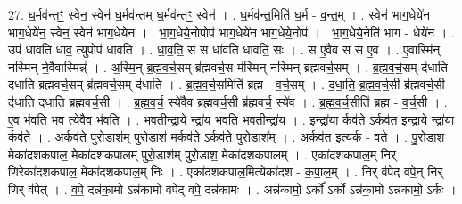 \documentclass[17pt]{extarticle}
\begin{document}
27. घ॒र्मव॑न्तꣳ॒॒ स्वेन॒ स्वेन॑ घ॒र्मव॑न्तम् घ॒र्मव॑न्तꣳ॒॒ स्वेन॑ । . घ॒र्मव॑न्त॒मिति॑ घ॒र्म - व॒न्त॒म् । . स्वेन॑ भाग॒धेये॑न भाग॒धेये॑न॒ स्वेन॒ स्वेन॑ भाग॒धेये॑न । . भा॒ग॒धेये॒नोपोप॑ भाग॒धेये॑न भाग॒धेये॒नोप॑ । . भा॒ग॒धेये॒नेति॑ भाग - धेये॑न । . उप॑ धावति धाव॒ त्युपोप॑ धावति । . धा॒व॒ति॒ स स धा॑वति धावति॒ सः । . स ए॒वैव स स ए॒व । . ए॒वास्मि॑न् नस्मिन् ने॒वैवास्मिन्न्॑ । . अ॒स्मि॒न् ब्र॒ह्म॒व॒र्च॒सम् ब्र॑ह्मवर्च॒स म॑स्मिन् नस्मिन् ब्रह्मवर्च॒सम् । . ब्र॒ह्म॒व॒र्च॒सम् द॑धाति दधाति ब्रह्मवर्च॒सम् ब्र॑ह्मवर्च॒सम् द॑धाति । . ब्र॒ह्म॒व॒र्च॒समिति॑ ब्रह्म - व॒र्च॒सम् । . द॒धा॒ति॒ ब्र॒ह्म॒व॒र्च॒सी ब्र॑ह्मवर्च॒सी द॑धाति दधाति ब्रह्मवर्च॒सी । . ब्र॒ह्म॒व॒र्च॒ स्ये॑वैव ब्र॑ह्मवर्च॒सी ब्र॑ह्मवर्च॒ स्ये॑व । . ब्र॒ह्म॒व॒र्च॒सीति॑ ब्रह्म - व॒र्च॒सी । . ए॒व भ॑वति भव त्ये॒वैव भ॑वति । . भ॒व॒तीन्द्रा॒ये न्द्रा॑य भवति भव॒तीन्द्रा॑य । . इन्द्रा॑या॒ र्कव॑ते॒ ऽर्कव॑त॒ इन्द्रा॒ये न्द्रा॑या॒ र्कव॑ते । . अ॒र्कव॑ते पुरो॒डाश॑म् पुरो॒डाश॑ म॒र्कव॑ते॒ ऽर्कव॑ते पुरो॒डाश᳚म् । . अ॒र्कव॑त॒ इत्य॒र्क - व॒ते॒ । . पु॒रो॒डाश॒ मेका॑दशकपाल॒ मेका॑दशकपालम् पुरो॒डाश॑म् पुरो॒डाश॒ मेका॑दशकपालम् । . एका॑दशकपाल॒म् निर् णिरेका॑दशकपाल॒ मेका॑दशकपाल॒म् निः । . एका॑दशकपाल॒मित्येका॑दश - क॒पा॒ल॒म् । . निर् व॑पेद् वपे॒न् निर् णिर् व॑पेत् । . व॒पे॒ दन्न॑का॒मो ऽन्न॑कामो वपेद् वपे॒ दन्न॑कामः । . अन्न॑कामो॒ ऽर्को᳚ ऽर्को ऽन्न॑का॒मो ऽन्न॑कामो॒ ऽर्कः । \newline
\end{document}
